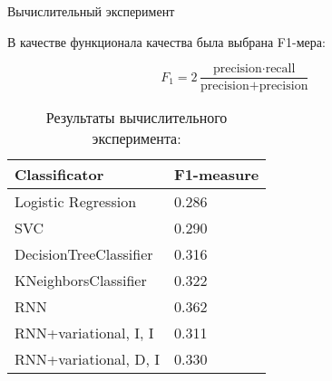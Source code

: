 \documentclass{beamer}
\begin{document}
\begin{frame}{Вычислительный эксперимент}

В качестве функционала качества была выбрана F1-мера:

$$F_1 = 2 \frac{\text{precision} \cdot \text{recall}}{\text{precision} + \text{precision}}$$


\vspace{-0.5cm}

\begin{table}[H]
	\centering
	\caption*{Результаты вычислительного эксперимента:}
	\label{my-label1}
	\begin{tabular}{|l|l|}
		\hline
		Classificator          & F1-measure \\ \hline
		Logistic Regression    & 0.286      \\ \hline
		SVC                    & 0.290      \\ \hline
		DecisionTreeClassifier & 0.316      \\ \hline
		KNeighborsClassifier   & 0.322      \\ \hline
		RNN                    & 0.362      \\ \hline
		RNN+variational, I, I  & 0.311      \\ \hline
		RNN+variational, D, I  & 0.330      \\ \hline
	\end{tabular}
\end{table}

\end{frame}

%
%
%
\end{document}
